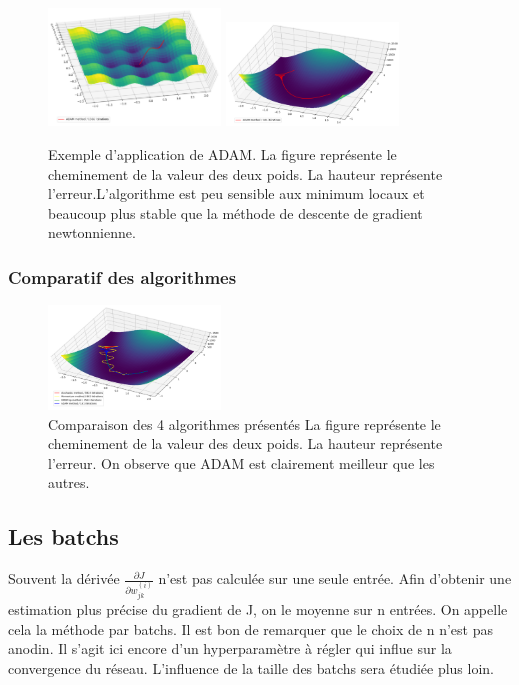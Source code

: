\begin{figure}[!h]
\centering
\includegraphics[width=130pt]{"images/MLP/adam"}
\hspace*{10mm}
\includegraphics[width=130pt]{"images/MLP/adampropre"}
\caption{Exemple d'application de ADAM. La figure représente le cheminement de la valeur des deux poids. La hauteur représente l'erreur.L'algorithme est peu sensible aux minimum locaux et beaucoup plus stable que la méthode de descente de gradient newtonnienne.}
\label{ADAM}
\end{figure}



\subsubsection{Comparatif des algorithmes}

\begin{figure}[!h]
\centering
\includegraphics[width=130pt]{"images/MLP/comparatifoptimiseurs"}
\caption{Comparaison des 4 algorithmes présentés La figure représente le cheminement de la valeur des deux poids. La hauteur représente l'erreur. On observe que ADAM est clairement meilleur que les autres.}
\label{Comparatifoptimiseurs}
\end{figure}

\subsection{Les batchs}
Souvent la dérivée $\frac{\partial J}{\partial w_{jk}^{(i)}}$ n'est pas calculée sur une seule entrée. Afin d'obtenir une estimation plus précise du gradient de J, on le moyenne sur n entrées. On appelle cela la méthode par batchs. Il est bon de remarquer que le choix de n n'est pas anodin. Il s'agit ici encore d'un hyperparamètre à régler qui influe sur la convergence du réseau. L'influence de la taille des batchs sera étudiée plus loin.



